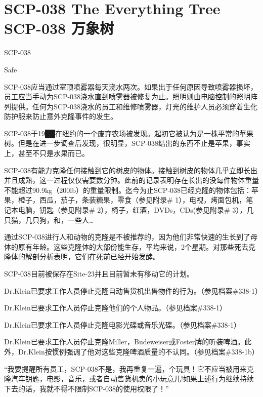 \chapter[SCP-038 万象树]{
    SCP-038 The Everything Tree\\
    SCP-038 万象树
}

\label{chap:SCP-038}

SCP-038

Safe

SCP-038应当通过室顶喷雾器每天浇水两次。如果出于任何原因导致喷雾器损坏，员工应当手动为SCP-038浇水直到喷雾器被修复为止。照明则由电脑控制的照明阵列提供。任何为SCP-038浇水的员工和维修喷雾器，灯光的维护人员必须穿着生化防护服来防止意外克隆事件的发生。

SCP-038于19██在纽约的一个废弃农场被发现。起初它被认为是一株平常的苹果树。但是在进一步调查后发现，很明显，SCP-038结出的东西不止是苹果，事实上，甚至不只是水果而已。

SCP-038有能力克隆任何接触到它的树皮的物体。接触到树皮的物体几乎立即长出并且成熟，这一过程仅仅需要数分钟。此前的记录表明存在长出的没每件物体重量不能超过90.9kg（200lb）的重量限制。迄今为止SCP-038已经克隆的物体包括：苹果，橙子，西瓜，茄子，条装糖果，零食（参见附录\# 1），电视，烤面包机，笔记本电脑，钥匙（参见附录\# 2），椅子，红酒，DVDs，CDs(参见附录\# 3），几只猫，几只狗，和，一些人…

通过SCP-038进行人和动物的克隆是不被推荐的，因为他们非常快速的生长到了母体的原有年龄。这些克隆体的大部份能生存，平均来说，2个星期。对那些死去克隆体的解剖分析表明，它们在死前已经开始发酵。

SCP-038目前被保存在Site-23并且目前暂未有移动它的计划。

Dr.Klein已要求工作人员停止克隆自动售货机出售物件的行为。（参见档案\#338-1）

 Dr.Klein已要求工作人员停止克隆他们的个人物品。（参见档案\#338-1）

Dr.Klein已要求工作人员停止克隆电影光碟或音乐光碟。（参见档案\#338-1）

Dr.Klein已要求工作人员停止克隆Miller，Budeweiser或Foster牌的听装啤酒。此外，Dr.Klein按惯例强调了他对这些克隆啤酒质量的不认同。（参见档案\#338-1b）

\hr

“我要提醒所有员工，SCP-038不是，我再重复一遍，个玩具！它不应当被用来克隆汽车钥匙，电影，音乐，或者自动售货机卖的小玩意儿!如果上述行为继续持续下去的话，我就不得不限制SCP-038的使用权限了！”


